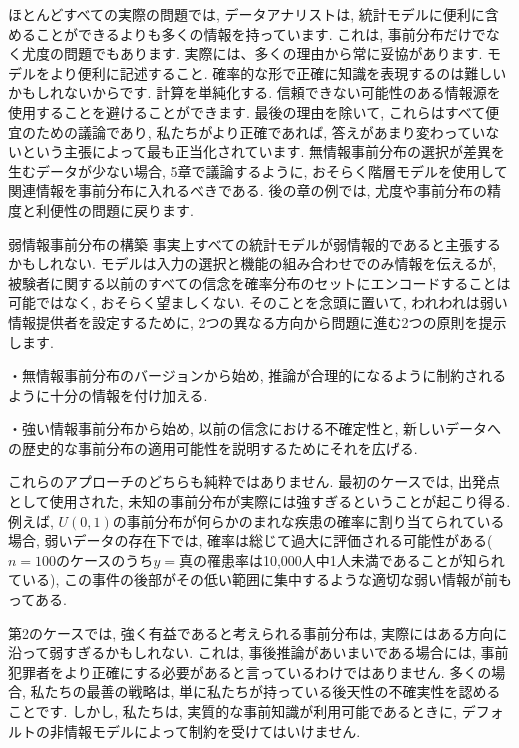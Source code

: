 \documentclass[10pt,dvipdfmx,a4]{beamer}
\begin{document}
\begin{frame}
ほとんどすべての実際の問題では, データアナリストは, 統計モデルに便利に含めることができるよりも多くの情報を持っています.
これは, 事前分布だけでなく尤度の問題でもあります.
実際には、多くの理由から常に妥協があります.
モデルをより便利に記述すること.
確率的な形で正確に知識を表現するのは難しいかもしれないからです.
計算を単純化する.
信頼できない可能性のある情報源を使用することを避けることができます.
最後の理由を除いて, これらはすべて便宜のための議論であり, 私たちがより正確であれば, 答えがあまり変わっていないという主張によって最も正当化されています.
無情報事前分布の選択が差異を生むデータが少ない場合, 5章で議論するように, おそらく階層モデルを使用して関連情報を事前分布に入れるべきである.
後の章の例では, 尤度や事前分布の精度と利便性の問題に戻ります.
\end{frame}


\begin{frame}{弱情報事前分布の構築}
事実上すべての統計モデルが弱情報的であると主張するかもしれない.
モデルは入力の選択と機能の組み合わせでのみ情報を伝えるが, 被験者に関する以前のすべての信念を確率分布のセットにエンコードすることは可能ではなく, おそらく望ましくない.
そのことを念頭に置いて, われわれは弱い情報提供者を設定するために, 2つの異なる方向から問題に進む2つの原則を提示します.

・無情報事前分布のバージョンから始め, 推論が合理的になるように制約されるように十分の情報を付け加える.

・強い情報事前分布から始め, 以前の信念における不確定性と, 新しいデータへの歴史的な事前分布の適用可能性を説明するためにそれを広げる.
\end{frame}


\begin{frame}
これらのアプローチのどちらも純粋ではありません.
最初のケースでは, 出発点として使用された, 未知の事前分布が実際には強すぎるということが起こり得る.
例えば, $U(0,1)$の事前分布が何らかのまれな疾患の確率に割り当てられている場合, 弱いデータの存在下では, 確率は総じて過大に評価される可能性がある($n = 100$のケースのうち$y =$真の罹患率は10,000人中1人未満であることが知られている), この事件の後部がその低い範囲に集中するような適切な弱い情報が前もってある.

第2のケースでは, 強く有益であると考えられる事前分布は, 実際にはある方向に沿って弱すぎるかもしれない.
これは, 事後推論があいまいである場合には, 事前犯罪者をより正確にする必要があると言っているわけではありません.
多くの場合, 私たちの最善の戦略は, 単に私たちが持っている後天性の不確実性を認めることです.
しかし, 私たちは, 実質的な事前知識が利用可能であるときに, デフォルトの非情報モデルによって制約を受けてはいけません.
\end{frame}
\end{document}
